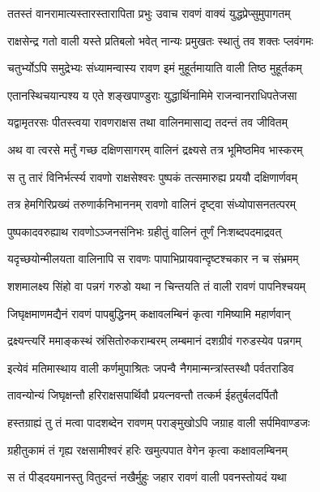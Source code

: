 \twolineshloka
{ततस्तं वानरामात्यस्तारस्तारापिता प्रभुः}
{उवाच रावणं वाक्यं युद्धप्रेप्सुमुपागतम्} %

\twolineshloka
{राक्षसेन्द्र गतो वाली यस्ते प्रतिबलो भवेत्}
{नान्यः प्रमुखतः स्थातुं तव शक्तः प्लवंगमः} %

\twolineshloka
{चतुर्भ्योऽपि समुद्रेभ्यः संध्यामन्वास्य रावण}
{इमं मुहूर्तमायाति वाली तिष्ठ मुहूर्तकम्} %

\twolineshloka
{एतानस्थिचयान्पश्य य एते शङ्खपाण्डुराः}
{युद्धार्थिनामिमे राजन्वानराधिपतेजसा} %

\twolineshloka
{यद्वामृतरसः पीतस्त्वया रावणराक्षस}
{तथा वालिनमासाद्य तदन्तं तव जीवितम्} %

\twolineshloka
{अथ वा त्वरसे मर्तुं गच्छ दक्षिणसागरम्}
{वालिनं द्रक्ष्यसे तत्र भूमिष्ठमिव भास्करम्} %

\twolineshloka
{स तु तारं विनिर्भर्त्स्य रावणो राक्षसेश्वरः}
{पुष्पकं तत्समारुह्य प्रययौ दक्षिणार्णवम्} %

\twolineshloka
{तत्र हेमगिरिप्रख्यं तरुणार्कनिभाननम्}
{रावणो वालिनं दृष्ट्वा संध्योपासनतत्परम्} %

\twolineshloka
{पुष्पकादवरुह्याथ रावणोऽञ्जनसंनिभः}
{ग्रहीतुं वालिनं तूर्णं निःशब्दपदमाद्रवत्} %

\twolineshloka
{यदृच्छयोन्मीलयता वालिनापि स रावणः}
{पापाभिप्रायवान्दृष्टश्चकार न च संभ्रमम्} %

\twolineshloka
{शशमालक्ष्य सिंहो वा पन्नगं गरुडो यथा}
{न चिन्तयति तं वाली रावणं पापनिश्चयम्} %

\twolineshloka
{जिघृक्षमाणमद्यैनं रावणं पापबुद्धिनम्}
{कक्षावलम्बिनं कृत्वा गमिष्यामि महार्णवान्} %

\twolineshloka
{द्रक्ष्यन्त्यरिं ममाङ्कस्थं स्रंसितोरुकराम्बरम्}
{लम्बमानं दशग्रीवं गरुडस्येव पन्नगम्} %

\twolineshloka
{इत्येवं मतिमास्थाय वाली कर्णमुपाश्रितः}
{जपन्वै नैगमान्मन्त्रांस्तस्थौ पर्वतराडिव} %

\twolineshloka
{तावन्योन्यं जिघृक्षन्तौ हरिराक्षसपार्थिवौ}
{प्रयत्नवन्तौ तत्कर्म ईहतुर्बलदर्पितौ} %

\twolineshloka
{हस्तग्राह्यं तु तं मत्वा पादशब्देन रावणम्}
{पराङ्मुखोऽपि जग्राह वाली सर्पमिवाण्डजः} %

\twolineshloka
{ग्रहीतुकामं तं गृह्य रक्षसामीश्वरं हरिः}
{खमुत्पपात वेगेन कृत्वा कक्षावलम्बिनम्} %

\twolineshloka
{स तं पीड्दयमानस्तु वितुदन्तं नखैर्मुहुः}
{जहार रावणं वाली पवनस्तोयदं यथा} %


